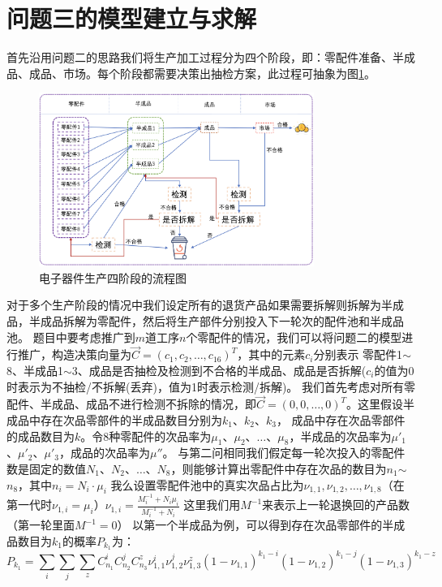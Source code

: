 \documentclass[withoutpreface,bwprint]{cumcmthesis} %
\begin{document}
\section{问题三的模型建立与求解}
首先沿用问题二的思路我们将生产加工过程分为四个阶段，即：零配件准备、半成品、成品、市场。每个阶段都需要决策出抽检方案，此过程可抽象为图\ref{fig:pro3-1}。
\begin{figure}[H]
	\centering
	\includegraphics[width=0.8\textwidth]{Fig/pro3-1.png}
	\caption{电子器件生产四阶段的流程图}
	\label{fig:pro3-1}
\end{figure}
对于多个生产阶段的情况中我们设定所有的退货产品如果需要拆解则拆解为半成品，半成品拆解为零配件，然后将生产部件分别投入下一轮次的配件池和半成品池。
题目中要考虑推广到$m$道工序$n$个零配件的情况，我们可以将问题二的模型进行推广，构造决策向量为$\vec{C}=(c_{1},c_{2},\dots,c_{16})^{T}$，其中的元素$c_i$分别表示
零配件1$\sim$8、半成品1$\sim$3、成品是否抽检及检测到不合格的半成品、成品是否拆解($c_{i}$的值为0时表示为不抽检/不拆解(丢弃)，值为1时表示检测/拆解)。
我们首先考虑对所有零配件、半成品、成品不进行检测不拆除的情况，即$\vec{C}=(0,0,\dots,0)^{T}$。这里假设半成品中存在次品零部件的半成品数目分别为$k_{1}$、$k_{2}$、$k_{3}$，
成品中存在次品零部件的成品数目为$k$。令8种零配件的次品率为$\mu_{1}$、$\mu_{2}$、$\dots$、$\mu_{8}$，半成品的次品率为$\mu'_{1}$、$\mu'_{2}$、$\mu'_{3}$，成品的次品率为$\mu''$。
与第二问相同我们假定每一轮次投入的零配件数是固定的数值$N_{1}$、$N_{2}$、$\dots$、$N_{8}$，则能够计算出零配件中存在次品的数目为$n_{1}$$\sim$$n_{8}$，其中$n_{i}=N_{i}\cdot\mu_{i}$
		我么设置零配件池中的真实次品占比为$\nu_{1,1},\nu_{1,2},\dots,\nu_{1,8}$（在第一代时$\nu_{1,i}=\mu_{i}$）$\nu_{1,i}=\frac{M_{i}^{-1}+N_{i}\mu_{i}}{M_{i}^{-1}+N_{i}}$
		这里我们用$M^{-1}$来表示上一轮退换回的产品数（第一轮里面$M^{-1}=0$）
		以第一个半成品为例，可以得到存在次品零部件的半成品数目为$k_{1}$的概率$P_{k_{1}}$为：
		\begin{equation}
			P_{k_{1}}=\sum_{i}\sum_{j}\sum_{z}C_{n_{1}}^{i}C_{n_{2}}^{j}C_{n_{3}}^{z}\nu_{1,1}^{i}\nu_{1,2}^{j}\nu_{1,3}^{z}(1-\nu_{1,1})^{k_{1}-i}(1-\nu_{1,2})^{k_{1}-j}(1-\nu_{1,3})^{k_{1}-z}
			\label{eq:6}
		\end{equation}
\end{document}
